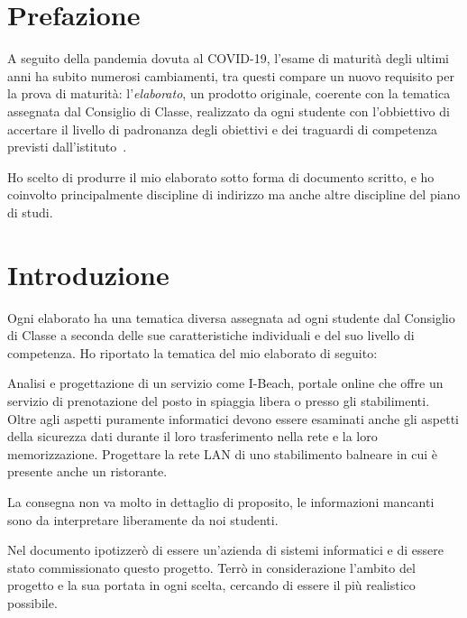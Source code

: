 \section*{Prefazione}
A seguito della pandemia dovuta al COVID-19, l'esame di maturit\`a degli ultimi anni ha subito numerosi cambiamenti, tra questi compare un nuovo requisito per la prova di maturit\`a: l'\emph{elaborato}, un prodotto originale, coerente con la tematica assegnata dal Consiglio di Classe, realizzato da ogni studente con l'obbiettivo di accertare il livello di padronanza degli obiettivi e dei traguardi di competenza previsti dall'istituto~\cite{elaborato-intro}.

Ho scelto di produrre il mio elaborato sotto forma di documento scritto, e ho coinvolto principalmente discipline di indirizzo ma anche altre discipline del piano di studi.

\section{Introduzione}
Ogni elaborato ha una tematica diversa assegnata ad ogni studente dal Consiglio di Classe a seconda delle sue caratteristiche individuali e del suo livello di competenza. Ho riportato la tematica del mio elaborato di seguito:

\begin{center}
    \begin{minipage}{0.8\linewidth}
        Analisi e progettazione di un servizio come I-Beach, portale online che offre un
        servizio di prenotazione del posto in spiaggia libera o presso gli stabilimenti.
        Oltre agli aspetti puramente informatici devono essere esaminati anche gli aspetti
        della sicurezza dati durante il loro trasferimento nella rete e la loro
        memorizzazione. Progettare la rete LAN di uno stabilimento balneare in cui è presente
        anche un ristorante. 
    \end{minipage}
\end{center}

La consegna non va molto in dettaglio di proposito, le informazioni mancanti sono da interpretare liberamente da noi studenti.

Nel documento ipotizzer\`o di essere un'azienda di sistemi informatici e di essere stato commissionato questo progetto. Terr\`o in considerazione l'ambito del progetto e la sua portata in ogni scelta, cercando di essere il pi\`u realistico possibile.
